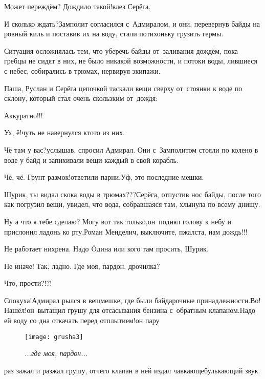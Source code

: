 \diagdash Может переждём? Дождило такой!\mdash влез Серёга.

\diagdash И сколько ждать?\mdash Замполит согласился с~Адмиралом, и они, перевернув байды на ровный киль и поставив их на воду, стали потихоньку грузить гермы. 

Ситуация осложнялась тем, что уберечь байды от~заливания дождём, пока гребцы не сидят в них, не было никакой возможности, и потоки воды, лившиеся с небес, собирались в трюмах, нервируя экипажи.

Паша, Руслан и Серёга цепочкой таскали вещи сверху от~стоянки к воде по склону, который стал очень скользким от~дождя:

\diagdash Аккуратно!!!

\diagdash Ух, ё!\mdash чуть не навернулся кто\sdash то из них.

\diagdash Чё там у вас?\mdash услышав, спросил Адмирал. Они с~Замполитом стояли по колено в воде у байд и запихивали вещи каждый в свой корабль.

\diagdash Чё, чё. Грунт размок!\mdash ответили парни.\mdash Уф, это последние мешки.

\diagdash Шурик, ты видал скока воды в трюмах???\mdash Серёга, отпустив нос байды, после того как погрузил вещи, увидел, что вода, собравшаяся там, хлынула по всему днищу.

\diagdash Ну а что я тебе сделаю? Могу вот так только,\mdash он~поднял голову к небу и прислонил ладонь ко рту,\mdash Роман Менделич, выключите, п\sdash жалста, нам дождь!!!

\diagdash Не работает нихрена. Надо {\'{O}}дина или кого там просить, Шурик.

\diagdash Не иначе! Так, ладно. Где моя, пардон, дрочилка?

\diagdash Что, прости?!?!

\diagdash Спокуха!\mdash Адмирал рылся в вещмешке, где были байдарочные принадлежности.\mdash Во! Нашёл!\mdash он~вытащил грушу для отсасывания бензина с~обратным клапаном.\mdash Надо ей воду со дна откачать перед отплытием!\mdash он пару \begin{wrapfigure}[12]{l}{0.50\textwidth}
	\centering
	\texttt{[image: grusha3]}
	\caption{\small\textit{...где моя, пардон...}}
\end{wrapfigure}раз зажал и разжал грушу, отчего клапан в ней издал чавкающе\sdash булькающий звук.

